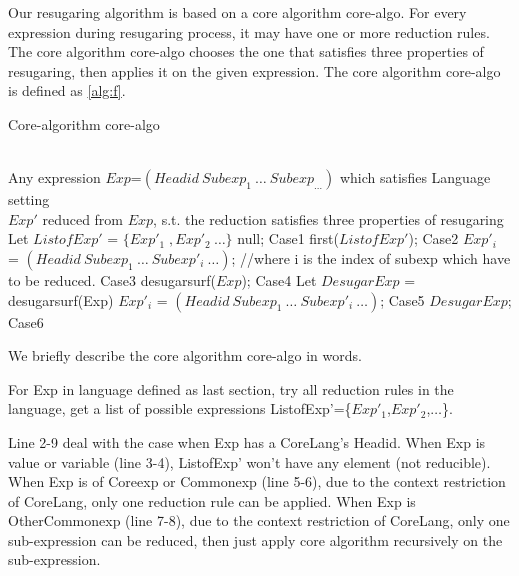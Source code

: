 Our resugaring algorithm is based on a core algorithm core-algo. For every expression during resugaring process, it may have one or more reduction rules. The core algorithm core-algo chooses the one that satisfies three properties of resugaring, then applies it on the given expression. The core algorithm core-algo is defined as \ref{alg:f}.
\begin{algorithm}
	\caption{Core-algorithm core-algo}
	\label{alg:f}     %
	\begin{algorithmic}[1]       %
		\REQUIRE ~~\\      %
		Any expression $Exp$=$(Headid~Subexp_{1}~\ldots~Subexp_{\ldots})$ which satisfies Language setting
		\ENSURE ~~\\     %
		$Exp'$ reduced from $Exp$, s.t. the reduction satisfies three properties of resugaring
		\STATE     Let $ListofExp'$ = $\{Exp'_{1}\;,Exp'_{2}~\ldots\}$
		\RETURN null; \hfill Case1
		\RETURN first($ListofExp'$); \hfill Case2
		\ELSE
		\RETURN $Exp'_{i}$ = $(Headid~Subexp_{1}~\ldots~Subexp'_{i}~\ldots)$; //where i is the index of subexp which have to be reduced. \hfill Case3
		\ENDIF
		\ELSE
		\RETURN desugarsurf($Exp$); \hfill Case4
		\ELSE
		\STATE Let $DesugarExp$ = desugarsurf(Exp)
		\RETURN $Exp'_{i}$ = $(Headid~Subexp_{1}~\ldots~Subexp'_{i}~\ldots)$; \hfill Case5
		\ELSE
		\RETURN $DesugarExp$; \hfill Case6
		\ENDIF
		\ENDIF
		\ENDIF

	\end{algorithmic}
\end{algorithm}

We briefly describe the core algorithm core-algo in words.

For Exp in language defined as last section, try all reduction rules in the language, get a list of possible expressions ListofExp'=\{$Exp'_{1}$,$Exp'_{2}$,$\ldots$\}.

Line 2-9 deal with the case when Exp has a CoreLang's Headid. When Exp is value or variable (line 3-4), ListofExp' won't have any element (not reducible). When Exp is of Coreexp or Commonexp (line 5-6), due to the context restriction of CoreLang, only one reduction rule can be applied. When Exp is OtherCommonexp (line 7-8), due to the context restriction of CoreLang, only one sub-expression can be reduced, then just apply core algorithm recursively on the sub-expression.

